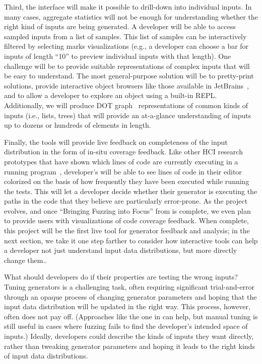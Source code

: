 Third, the interface will make it possible to drill-down into individual inputs.
In many cases, aggregate statistics will not be enough for understanding whether
the right kind of inputs are being generated. A developer will be able to access
sampled inputs from a list of samples. This list of samples can be interactively
filtered by selecting marks visualizations (e.g., a developer can choose a bar
for inputs of length ``10'' to preview individual inputs with that length). One
challenge will be to provide suitable representations of complex inputs that
will be easy to understand. The most general-purpose solution will be to
pretty-print solutions, provide interactive object browsers like those available
in JetBrains~\cite{tool:jetbrains}, and to allow a developer to explore an
object using a built-in REPL. Additionally, we will produce DOT
graph~\cite{ellson_graphviz_2002} representations of common kinds of inputs
(i.e., lists, trees) that will provide an at-a-glance understanding of inputs up
to dozens or hundreds of elements in length.

Finally, the tools will provide live feedback on completeness of the input
distribution in the form of in-situ coverage feedback. Like other HCI research
prototypes that have shown which lines of code are currently executing in a
running
program~\cite{ref:brandt2010rehearse,ref:oney2009firecrystal,ref:burg2013record},
developer's will be able to see lines of code in their editor colorized on the
basis of how frequently they have been executed while running the
tests. This will let a developer decide whether their generator is executing the
paths in the code that they believe are particularly error-prone.
\iflater
As the project evolves, and once ``Bringing Fuzzing into Focus'' from
 is complete, we even plan to provide users with
visualizations of code coverage feedback.
\fi
When complete, this project will be the first live tool for generator
feedback and analysis; in the next section, we take it one step farther to
consider how interactive tools can help a developer not just understand input
data distributions, but more directly change them..

%
What should developers do if their properties are testing the wrong
inputs? Tuning generators is a challenging task, often requiring significant
trial-and-error through an opaque process of changing generator parameters and
hoping that the input data distribution will be updated in the right way. This
process, however, often does not pay off. (Approaches like the one in
 can help, but manual tuning is still useful in cases
where fuzzing fails to find the developer's intended space of inputs.) Ideally,
developers could describe the kinds of inputs they want directly, rather than
tweaking generator parameters and hoping it leads to the right kinds of input
data distributions.

